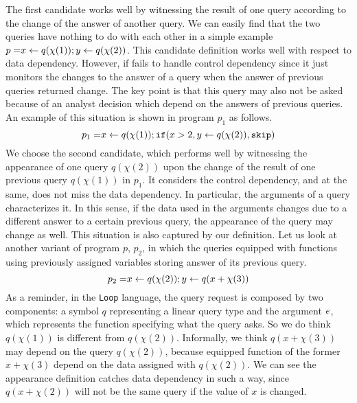    The first candidate works well by witnessing the result of one query according to the change of the answer of another query. We can easily find that the two queries have nothing to do with each other in a simple example   
     $ p = \mathrel{ x \leftarrow q(\chi(1)) } ; \mathrel{ y \leftarrow q(\chi(2)) }$. This candidate definition works well with respect to data dependency. However, if fails to handle control dependency since it just monitors the changes to the answer of a query when the answer of previous queries returned change. The key point is that this query may also not be asked because of an analyst decision which depend on the answers of previous queries. An example of this situation is shown in program $p_1$ as follows.
      \[
      p_1 = \mathrel{ x \leftarrow q(\chi(1)) } ; \mathtt{if}( x > 2 ,\mathrel{ y \leftarrow q(\chi(2)) }, \mathtt{skip} )
   \]
   We choose the second candidate, which performs well by witnessing the appearance of one query $q(\chi(2))$ upon the change of the result of one previous query $q(\chi(1))$ in $p_1$. It considers the control dependency, and at the same, does not miss the data dependency. In particular, the arguments of a query characterizes it. In this sense, if the data used in the arguments changes due to a different answer to a certain previous query, the appearance of the query may change as well. This situation is also captured by our definition. Let us look at another variant of program $p$, $p_2$, in which the queries equipped with functions using previously assigned variables storing answer of its previous query.
    \[
      p_2 = \mathrel{ x \leftarrow q(\chi(2)) } ; \mathrel{ y \leftarrow q(x+\chi(3)) }
   \]
    As a reminder, in the {\tt Loop} language, the query request is composed by two components: a symbol $q$ representing a linear query type and the argument $e$, which represents the function specifying what the query asks. So we do think $q(\chi(1))$ is different from $q(\chi(2))$. Informally, we think $q(x+\chi(3))$ may depend on the query $q(\chi(2))$, because equipped function of the former $x+\chi(3)$ depend on the data assigned with $q(\chi(2))$. We can see the appearance definition catches data dependency in such a way, since $q(x+\chi(2))$ will not be the same query if the value of $x$ is changed.    
   
